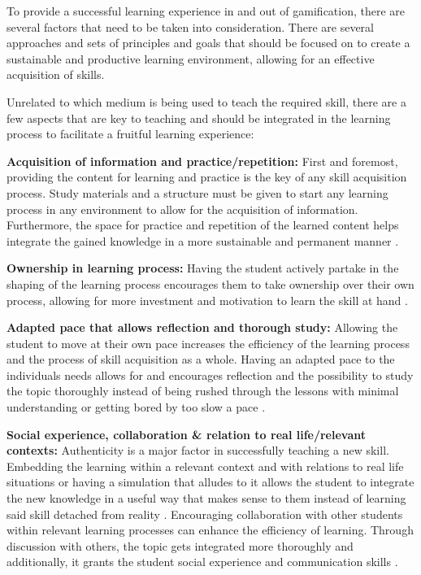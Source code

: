 To provide a successful learning experience in and out of gamification, there are several factors that need to be taken into consideration. There are several approaches and sets of principles and goals that should be focused on to create a sustainable and productive learning environment, allowing for an effective acquisition of skills.

Unrelated to which medium is being used to teach the required skill, there are a few aspects that are key to teaching and should be integrated in the learning process to facilitate a fruitful learning experience:

\textbf{Acquisition of information and practice/repetition:}
First and foremost, providing the content for learning and practice is the key of any skill acquisition process. Study materials and a structure must be given to start any learning process in any environment to allow for the acquisition of information. Furthermore, the space for practice and repetition of the learned content helps integrate the gained knowledge in a more sustainable and permanent manner \cite{lifelong}.

\textbf{Ownership in learning process:}
Having the student actively partake in the shaping of the learning process encourages them to take ownership over their own process, allowing for more investment and motivation to learn the skill at hand \cite{aspects}.

\textbf{Adapted pace that allows reflection and thorough study:}
Allowing the student to move at their own pace increases the efficiency of the learning process and the process of skill acquisition as a whole. Having an adapted pace to the individuals needs allows for and encourages reflection and the possibility to study the topic thoroughly instead of being rushed through the lessons with minimal understanding or getting bored by too slow a pace \cite{online}.

\textbf{Social experience, collaboration \& relation to real life/relevant contexts:}
Authenticity is a major factor in successfully teaching a new skill. Embedding the learning within a relevant context and with relations to real life situations or having a simulation that alludes to it allows the student to integrate the new knowledge in a useful way that makes sense to them instead of learning said skill detached from reality \cite{aspects}.
Encouraging collaboration with other students within relevant learning processes can enhance the efficiency of learning. Through discussion with others, the topic gets integrated more thoroughly and additionally, it grants the student social experience and communication skills \cite{lifelong}.

